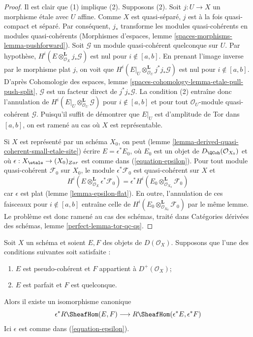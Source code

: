 \begin{proof}
Il est clair que (1) implique (2). Supposons (2). Soit $j : U \to X$ un
morphisme \'etale avec $U$ affine. Comme $X$ est quasi-s\'epar\'e, $j$ est \`a
la fois quasi-compact et s\'epar\'e. Par cons\'equent, $j_*$ transforme les
modules quasi-coh\'erents en modules quasi-coh\'erents (Morphismes d'espaces,
lemme
\ref{spaces-morphisms-lemma-pushforward}).
Soit $\mathcal{G}$ un module quasi-coh\'erent quelconque sur $U$.
Par hypoth\`ese,
$H^i(E \otimes_{\mathcal{O}_X}^\mathbf{L} j_*\mathcal{G})$ est nul pour
$i \notin [a,b]$. En prenant l'image inverse par le morphisme plat $j$, on
voit que
$H^i(E|_U \otimes_{\mathcal{O}_U}^\mathbf{L} j^*j_*\mathcal{G})$ est nul
pour $i \notin [a,b]$. D'apr\`es Cohomologie des espaces, lemme
\ref{spaces-cohomology-lemma-etale-pull-push-split}, $\mathcal{G}$ est un
facteur direct de $j^*j_*\mathcal{G}$. La condition (2) entra\^ine donc
l'annulation de
$H^i(E|_U \otimes_{\mathcal{O}_U}^\mathbf{L} \mathcal{G})$
pour $i \notin [a,b]$ et pour tout $\mathcal{O}_U$-module quasi-coh\'erent
$\mathcal{G}$. Puisqu'il suffit de d\'emontrer que $E|_U$ est d'amplitude de
Tor dans $[a,b]$, on est ramen\'e au cas o\`u $X$ est repr\'esentable.

\medskip\noindent
Si $X$ est repr\'esent\'e par un sch\'ema $X_0$, on peut (lemme
\ref{lemma-derived-quasi-coherent-small-etale-site}) \'ecrire
$E=\epsilon^*E_0$, o\`u $E_0$ est un objet de
$D_\QCoh(\mathcal{O}_{X_0})$ et o\`u
$\epsilon : X_\etale \to (X_0)_{Zar}$ est comme dans
(\ref{equation-epsilon}). Pour tout module quasi-coh\'erent
$\mathcal{F}_0$ sur $X_0$, le module $\epsilon^*\mathcal{F}_0$ est
quasi-coh\'erent sur $X$ et
$$
H^i(E \otimes_{\mathcal{O}_X}^\mathbf{L} \epsilon^*\mathcal{F}_0)
=
\epsilon^*H^i(E_0 \otimes_{\mathcal{O}_{X_0}}^\mathbf{L} \mathcal{F}_0)
$$
car $\epsilon$ est plat (lemme \ref{lemma-epsilon-flat}). En outre,
l'annulation de ces faisceaux pour $i \notin [a,b]$ entra\^ine celle de
$H^i(E_0 \otimes_{\mathcal{O}_{X_0}}^\mathbf{L} \mathcal{F}_0)$
par le m\^eme lemme. Le probl\`eme est donc ramen\'e au cas des sch\'emas,
trait\'e dans Cat\'egories d\'eriv\'ees des sch\'emas, lemme
\ref{perfect-lemma-tor-qc-qs}.
\end{proof}

\begin{lemma}
\label{lemma-descend-RHom}
Soit $X$ un sch\'ema et soient $E,F$ des objets de $D(\mathcal{O}_X)$.
Supposons que l'une des conditions suivantes soit satisfaite :
\begin{enumerate}
\item $E$ est pseudo-coh\'erent et $F$ appartient \`a
$D^+(\mathcal{O}_X)$;
\item $E$ est parfait et $F$ est quelconque.
\end{enumerate}
Alors il existe un isomorphisme canonique
$$
\epsilon^*R\SheafHom(E, F) \longrightarrow R\SheafHom(\epsilon^*E, \epsilon^*F)
$$
Ici $\epsilon$ est comme dans (\ref{equation-epsilon}).
\end{lemma}

